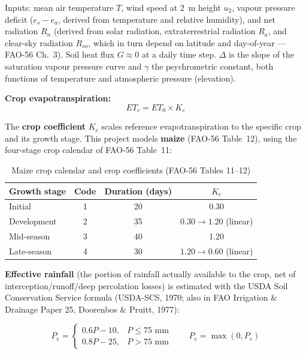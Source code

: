 \documentclass[11pt,a4paper]{article}
\begin{document}
Inputs: mean air temperature $T$, wind speed at 2~m height $u_2$, vapour pressure
deficit ($e_s - e_a$, derived from temperature and relative humidity), and net
radiation $R_n$ (derived from solar radiation, extraterrestrial radiation
$R_a$, and clear-sky radiation $R_{so}$, which in turn depend on latitude and
day-of-year --- FAO-56 Ch.~3). Soil heat flux $G \approx 0$ at a daily time
step. $\Delta$ is the slope of the saturation vapour pressure curve and
$\gamma$ the psychrometric constant, both functions of temperature and
atmospheric pressure (elevation).

\textbf{Crop evapotranspiration:}
\begin{equation}
ET_c = ET_0 \times K_c
\label{eq:etc}
\end{equation}

The \textbf{crop coefficient} $K_c$ scales reference evapotranspiration to the
specific crop and its growth stage. This project models \textbf{maize} (FAO-56
Table~12), using the four-stage crop calendar of FAO-56 Table~11:

\begin{table}[H]
\centering
\caption{Maize crop calendar and crop coefficients (FAO-56 Tables 11--12)}
\label{tab:crop-calendar}
\begin{tabular}{@{}lccc@{}}
\toprule
\textbf{Growth stage} & \textbf{Code} & \textbf{Duration (days)} & \textbf{$K_c$} \\
\midrule
Initial      & 1 & 20 & 0.30 \\
Development  & 2 & 35 & $0.30 \rightarrow 1.20$ (linear) \\
Mid-season   & 3 & 40 & 1.20 \\
Late-season  & 4 & 30 & $1.20 \rightarrow 0.60$ (linear) \\
\bottomrule
\end{tabular}
\end{table}

\textbf{Effective rainfall} (the portion of rainfall actually available to the
crop, net of interception/runoff/deep percolation losses) is estimated with the
USDA Soil Conservation Service formula (USDA-SCS, 1970; also in FAO Irrigation
\& Drainage Paper 25, Doorenbos \& Pruitt, 1977):

\begin{equation}
P_e =
\begin{cases}
0.6P - 10, & P \le 75\text{ mm} \\
0.8P - 25, & P > 75\text{ mm}
\end{cases}
\qquad P_e = \max(0, P_e)
\label{eq:effrain}
\end{equation}
\end{document}
